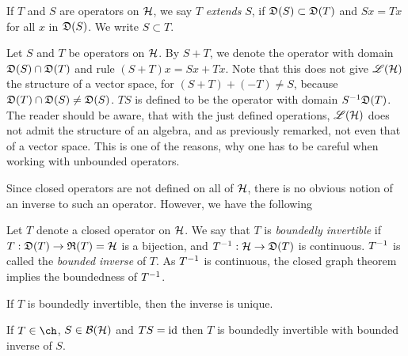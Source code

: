 \begin{defi}
  If $T$ and $S$ are operators on $\mathcal{H}$, we say $T$ \textit{extends} $S$,
  if $\mathfrak{D}(S)\subset
  \mathfrak{D}(T)$ and $ Sx = Tx$ for all $x$ in $ \mathfrak{D} (S)$. We write $S \subset T$.
\end{defi}

Let $S$ and $ T$ be operators on $\mathcal{H}$. By $S + T$,  we denote
the operator with domain 
$\mathfrak{D}(S) \cap \mathfrak{D}(T)$ and rule $(S + T)x = Sx + Tx$. Note that this does
not give $\mathscr{L}(\mathcal{H})$ the structure of a vector space, for 
$(S + T) +( - T) \neq S$, because
$\mathfrak{D}(T)\cap \mathfrak{D}(S) \neq \mathfrak{D}(S)$.
$TS$ is defined to be the operator with domain $S^{-1} \mathfrak{D}(T)$. The reader should
be aware, that with the just defined operations, $\mathscr{L}(\mathcal{H})$ does not admit the
structure of an algebra, and as previously remarked, not even that of a
vector space. This is one
of the reasons, why one has to be careful when working with unbounded
operators. 

Since closed operators are not defined on all of $\mathcal{H}$,
there is no obvious notion of an inverse to such an operator.
However, we have the following

\begin{defi}
 Let $T$ denote a closed operator on $\mathcal{H}$. We say that $T$ is 
 \textit{boundedly invertible} if
 $T:\mathfrak{D}(T) \to \mathfrak{R}(T)= \mathcal{H}$ is a bijection, and $T^{-1} :\mathcal{H} \to \mathfrak{D}(T)$
 is continuous. $T^{-1}$ is called the \textit{bounded inverse} of $T$. As $T^{-1}$ is
 continuous, the closed graph theorem implies the boundedness of $T^{-1}$.
\end{defi}

\begin{rem}
 If $T$ is boundedly invertible, then the inverse is unique.
\end{rem}

% 
% 
% 


\begin{lem}
 If $T \in \ch$, $S \in \mathcal{B}(\mathcal{H})$ and $ TS = \operatorname{id}$ then $T$ is boundedly invertible
 with bounded inverse of $S$.
\end{lem}

